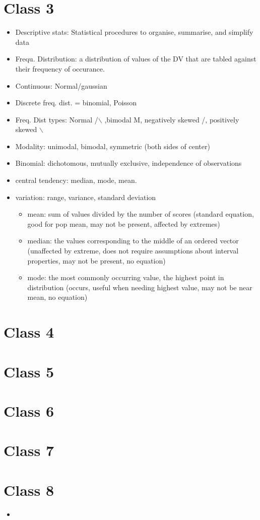 \documentclass[11pt]{article}
\newenvironment{itemise}{
\begin{itemize}
  \setlength{\itemsep}{1pt}
  \setlength{\parskip}{0pt}
  \setlength{\parsep}{0pt}
}{\end{itemize}}
\begin{document}
\section*{Class 3}
\begin{itemise}
\item Descriptive stats: Statistical procedures to organise, summarise, and simplify data
\item Frequ. Distribution: a distribution of values of the DV that are tabled against their frequency of occurance.
\item Continuous: Normal/gaussian
\item Discrete freq. dist. = binomial, Poisson
\item Freq. Dist types: Normal /$\backslash$ ,bimodal M, negatively skewed /, positively skewed $\backslash$ 
\item Modality: unimodal, bimodal, symmetric (both sides of center)
\item Binomial: dichotomous, mutually exclusive, independence of observations
\item central tendency: median, mode, mean.
\item variation: range, variance, standard deviation
\begin{itemise}
\item mean: sum of values divided by the number of scores (standard equation, good for pop mean, may not be present, affected by extremes)
\item median: the values corresponding to the middle of an ordered vector (unaffected by extreme, does not require assumptions about interval properties, may not be present, no equation)
\item mode: the most commonly occurring value, the highest point in distribution (occurs, useful when needing highest value, may not be near mean, no equation)
\end{itemise}
\end{itemise}
\section*{Class 4}
\section*{Class 5}
\section*{Class 6}
\section*{Class 7}
\section*{Class 8}


\begin{itemise}
\item 
\end{itemise}

















%
%
\end{document}
